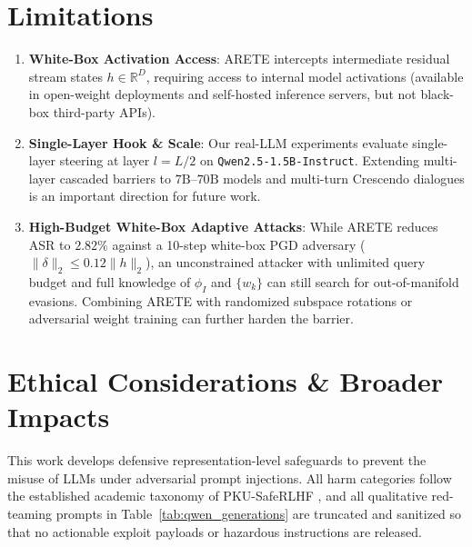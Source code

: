 \documentclass[11pt,twocolumn,a4paper]{article}
\begin{document}
\section*{Limitations}
\begin{enumerate}[leftmargin=*,nosep]
    \item \textbf{White-Box Activation Access}: ARETE intercepts intermediate residual stream states $h \in \mathbb{R}^D$, requiring access to internal model activations (available in open-weight deployments and self-hosted inference servers, but not black-box third-party APIs).
    \item \textbf{Single-Layer Hook \& Scale}: Our real-LLM experiments evaluate single-layer steering at layer $l = L/2$ on \texttt{Qwen2.5-1.5B-Instruct}. Extending multi-layer cascaded barriers to $7\text{B}$--$70\text{B}$ models and multi-turn Crescendo dialogues \citep{russinovich2024crescendo} is an important direction for future work.
    \item \textbf{High-Budget White-Box Adaptive Attacks}: While ARETE reduces ASR to $2.82\%$ against a 10-step white-box PGD adversary ($\|\delta\|_2 \le 0.12\|h\|_2$), an unconstrained attacker with unlimited query budget and full knowledge of $\phi_I$ and $\{w_k\}$ can still search for out-of-manifold evasions. Combining ARETE with randomized subspace rotations or adversarial weight training can further harden the barrier.
\end{enumerate}

\section*{Ethical Considerations \& Broader Impacts}
This work develops defensive representation-level safeguards to prevent the misuse of LLMs under adversarial prompt injections. All harm categories follow the established academic taxonomy of PKU-SafeRLHF \citep{ji2024pkusaferlhf}, and all qualitative red-teaming prompts in Table~\ref{tab:qwen_generations} are truncated and sanitized so that no actionable exploit payloads or hazardous instructions are released.



\end{document}
